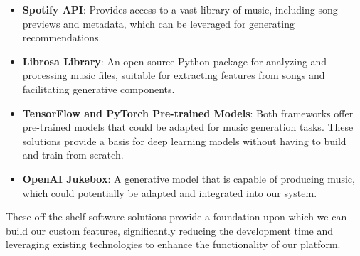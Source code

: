 \documentclass[12pt]{article}
\begin{document}
\begin{itemize}
    \item \textbf{Spotify API}: Provides access to a vast library of music, including song previews and metadata, which can be leveraged for generating recommendations.
    \item \textbf{Librosa Library}: An open-source Python package for analyzing and processing music files, suitable for extracting features from songs and facilitating generative components.
    \item \textbf{TensorFlow and PyTorch Pre-trained Models}: Both frameworks offer pre-trained models that could be adapted for music generation tasks. These solutions provide a basis for deep learning models without having to build and train from scratch.
    \item \textbf{OpenAI Jukebox}: A generative model that is capable of producing music, which could potentially be adapted and integrated into our system.
\end{itemize}

These off-the-shelf software solutions provide a foundation upon which we can build our custom features, significantly reducing the development time and leveraging existing technologies to enhance the functionality of our platform.
\end{document}
